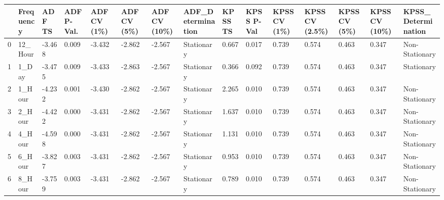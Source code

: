 \begin{tabular}{lllllllllllllll}
\toprule
 & Frequency & ADF TS & ADF P-Val. & ADF CV (1\%) & ADF CV (5\%) & ADF CV (10\%) & ADF_Determination & KPSS TS & KPSS P-Val & KPSS CV (1\%) & KPSS CV (2.5\%) & KPSS CV (5\%) & KPSS CV (10\%) & KPSS_Determination \\
\midrule
0 & 12_Hour & -3.468 & 0.009 & -3.432 & -2.862 & -2.567 & Stationary & 0.667 & 0.017 & 0.739 & 0.574 & 0.463 & 0.347 & Non-Stationary \\
1 & 1_Day & -3.475 & 0.009 & -3.433 & -2.863 & -2.567 & Stationary & 0.366 & 0.092 & 0.739 & 0.574 & 0.463 & 0.347 & Stationary \\
2 & 1_Hour & -4.232 & 0.001 & -3.430 & -2.862 & -2.567 & Stationary & 2.265 & 0.010 & 0.739 & 0.574 & 0.463 & 0.347 & Non-Stationary \\
3 & 2_Hour & -4.422 & 0.000 & -3.431 & -2.862 & -2.567 & Stationary & 1.637 & 0.010 & 0.739 & 0.574 & 0.463 & 0.347 & Non-Stationary \\
4 & 4_Hour & -4.598 & 0.000 & -3.431 & -2.862 & -2.567 & Stationary & 1.131 & 0.010 & 0.739 & 0.574 & 0.463 & 0.347 & Non-Stationary \\
5 & 6_Hour & -3.827 & 0.003 & -3.431 & -2.862 & -2.567 & Stationary & 0.953 & 0.010 & 0.739 & 0.574 & 0.463 & 0.347 & Non-Stationary \\
6 & 8_Hour & -3.759 & 0.003 & -3.431 & -2.862 & -2.567 & Stationary & 0.789 & 0.010 & 0.739 & 0.574 & 0.463 & 0.347 & Non-Stationary \\
\bottomrule
\end{tabular}
